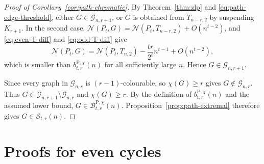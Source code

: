 \documentclass[11pt]{article}
\theoremstyle{definition}
\theoremstyle{plain}
\theoremstyle{remark}
\theoremstyle{plain}
\numberwithin{equation}{section}
\newcommand{\cG}{\mathcal G}
\newcommand{\cB}{\mathcal B}
\newcommand{\cS}{\mathcal S}
\newcommand{\N}{\mathcal N}
\begin{document}
\begin{proof}[Proof of Corollary~\ref{cor:path-chromatic}]
By Theorem~\ref{thm:zlp} and \eqref{eq:path-edge-threshold}, either $G\in\cG_{n,r+1}$, or $G$ is obtained from $T_{n-r,2}$ by suspending $K_{r+1}$. In the second case, $\N(P_t,G)=\N(P_t,T_{n-r,2})+O(n^{t-2})$, and \eqref{eq:even-T-diff} and \eqref{eq:odd-T-diff} give
\[
        \N(P_t,G)=\N(P_t,T_{n,2})-\frac{tr}{2^t}n^{t-1}+O(n^{t-2}),
\]
which is smaller than $b^{\mathrm P,\chi}_{t,r}(n)$ for all sufficiently large $n$. Hence $G\in\cG_{n,r+1}$.

Since every graph in $\cG_{n,r}$ is $(r-1)$-colourable, so $\chi(G)\ge r$ gives $G\notin\cG_{n,r}$. Thus $G\in\cG_{n,r+1}\setminus\cG_{n,r}$ and $\chi(G)\ge r$. By the definition of $b^{\mathrm P,\chi}_{t,r}(n)$ and the assumed lower bound, $G\in\cB^{\mathrm P,\chi}_{t,r}(n)$. Proposition~\ref{prop:path-extremal} therefore gives $G\in\cS_{t,r}(n)$.
\end{proof}

\section{Proofs for even cycles}\label{sec:proofs-cycles}
\end{document}
